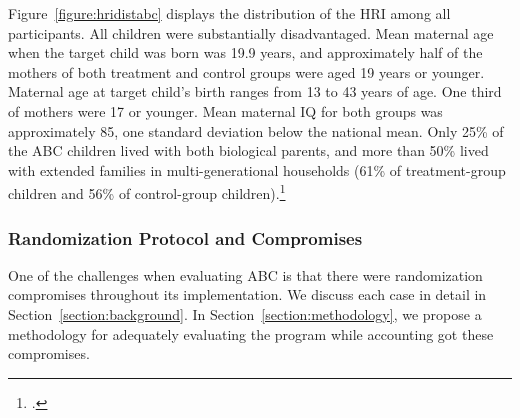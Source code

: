 \begin{appendices}
\noindent Figure~\ref{figure:hridistabc} displays the distribution of the HRI among all participants. All children were substantially disadvantaged. Mean maternal age when the target child was born was 19.9 years, and approximately half of the mothers of both treatment and control groups were aged 19 years or younger. Maternal age at target child's birth ranges from 13 to 43 years of age. One third of mothers were 17 or younger. Mean maternal IQ for both groups was approximately 85, one standard deviation below the national mean. Only 25\% of the ABC children lived with both biological parents, and more than 50\% lived with extended families in multi-generational households (61\% of treatment-group children and 56\% of control-group children).\footnote{\citet{Ramey_Campbell_1991_childreninpoverty,Campbell_Ramey_1994_CD}.}\\

\subsubsection{Randomization Protocol and Compromises} \label{appendix:randomization}

\noindent One of the challenges when evaluating ABC is that there were randomization compromises throughout its implementation. We discuss each case in detail in Section~\ref{section:background}. In Section~\ref{section:methodology},  we propose a methodology for adequately evaluating the program while accounting got these compromises.


\end{appendices}

